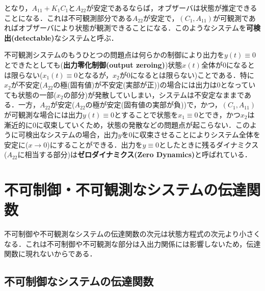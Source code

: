 となり，$A_{11}+ K_1 C_1$と$A_{22}$が安定であるならば，オブザーバは状態が推定できることになる．これは不可観測部分である$A_{22}$が安定で，$(C_1, A_{11})$が可観測であればオブザーバにより状態が観測できることになる．このようなシステムを{\bf 可検出(detectable)}なシステムと呼ぶ．


不可観測システムのもうひとつの問題点は何らかの制御により出力を$y(t) \equiv 0$とできたとしても({\bf 出力零化制御(output zeroing)})状態$x(t)$全体が$0$になるとは限らない($x_1(t) \equiv 0$となるが，$x_2$が$0$になるとは限らない)ことである．特に$x_2$が不安定($A_{22}$の極(固有値)が不安定(実部が正))の場合には出力は$0$となっていても状態の一部($x_2$の部分)が発散していしまい，システムは不安定なままである．一方，$A_{22}$が安定($A_{22}$の極が安定(固有値の実部が負))で，かつ，$(C_1, A_{11})$が可観測な場合には出力$y(t) \equiv 0$とすることで状態を$x_1 \equiv 0$とでき，かつ$x_2$は漸近的に$0$に収束していくため，状態の発散などの問題点が起こらない．このように可検出なシステムの場合，出力$y$を$0$に収束させることによりシステム全体を安定に($x \rightarrow 0$)にすることができる．出力を$y \equiv 0$としたときに残るダイナミクス($A_{22}$に相当する部分)は{\bf ゼロダイナミクス(Zero Dynamics)}と呼ばれている．




\section{不可制御・不可観測なシステムの伝達関数}

不可制御や不可観測なシステムの伝達関数の次元は状態方程式の次元より小さくなる．これは不可制御や不可観測な部分は入出力関係には影響しないため，伝達関数に現れないからである．

\subsection{不可制御なシステムの伝達関数}

